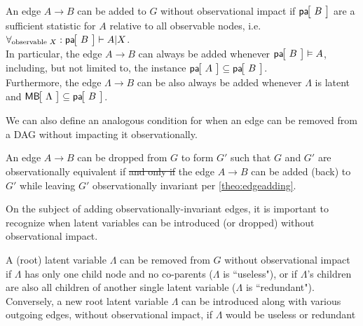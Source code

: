 


\begin{theorem}\label{theo:edgeadding}
An edge $A\to B$ can be added to $G$ without observational impact if $\NamedFunction{pa}{\!B\!}$ are a sufficient statistic for $A$ relative to all observable nodes, i.e. $\forall_{\text{observable }X}:\NamedFunction{pa}{\!B\!}\vdash A|X$.\\
In particular, the edge $A\to B$ can always be added whenever $\NamedFunction{pa}{\!B\!}\vDash A$, including, but not limited to, the instance  $\NamedFunction{pa}{\!A\!}\subseteq \NamedFunction{pa}{\!B\!}$.\\
Furthermore, the edge $\Lambda\to B$ can be also always be added whenever $\Lambda$ is latent and $\NamedFunction{MB}{\!\Lambda\!}\subseteq\NamedFunction{pa}{\!B\!}$.
\end{theorem}

We can also define an analogous condition for when an edge can be removed from a DAG without impacting it observationally.
\begin{corollary}\label{cor:edgedropping}
An edge $A\to B$ can be dropped from $G$ to form $G'$ such that $G$ and $G'$ are observationally equivalent if \sout{and only if} the edge $A\to B$ can be added (back) to $G'$ while leaving $G'$ observationally invariant per \cref{theo:edgeadding}.
\end{corollary}

On the subject of adding observationally-invariant edges, it is important to recognize when latent variables can be introduced (or dropped) without observational impact.
\begin{theorem}\label{theo:latentadding}
A (root) latent variable $\Lambda$ can be removed from $G$ without observational impact if $\Lambda$ has only one child node and no co-parents ($\Lambda$ is ``useless"), or if $\Lambda$'s children are also all children of another single latent variable ($\Lambda$ is ``redundant"). Conversely, a new root latent variable $\Lambda$ can be introduced along with various outgoing edges, without observational impact, if $\Lambda$ would be useless or redundant
\end{theorem}

